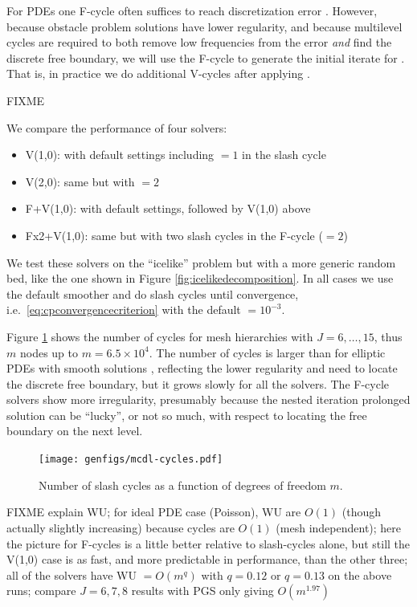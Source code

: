 \documentclass[letterpaper,final,12pt,reqno]{amsart}
\theoremstyle{claim}
\numberwithin{equation}{section}
\numberwithin{figure}{section}
\numberwithin{table}{section}
\numberwithin{theorem}{section}
\begin{document}
For PDEs one F-cycle often suffices to reach discretization error \cite{Trottenbergetal2001}.  However, because obstacle problem solutions have lower regularity, and because multilevel cycles are required to both remove low frequencies from the error \emph{and} find the discrete free boundary, we will use the F-cycle to generate the initial iterate for .  That is, in practice we do additional V-cycles after applying .

FIXME

We compare the performance of four solvers:
\begin{itemize}
\item \textsf{V(1,0)}:  with default settings including $=1$ in the slash cycle
\item \textsf{V(2,0)}: same but with $=2$
\item \textsf{F+V(1,0)}:  with default settings, followed by \textsf{V(1,0)} above
\item \textsf{Fx2+V(1,0)}: same but with two slash cycles in the F-cycle ($=2$)
\end{itemize}
We test these solvers on the ``icelike'' problem but with a more generic random bed, like the one shown in Figure \ref{fig:icelikedecomposition}.  In all cases we use the default  smoother and do slash cycles until convergence, i.e.~\eqref{eq:cpconvergencecriterion} with the default  $=10^{-3}$.

Figure \ref{fig:mcdl-cycles} shows the number of cycles for mesh hierarchies with $J=6,\dots,15$, thus $m$ nodes up to $m=6.5 \times 10^4$.  The number of cycles is larger than for elliptic PDEs with smooth solutions \cite{Trottenbergetal2001}, reflecting the lower regularity and need to locate the discrete free boundary, but it grows slowly for all the solvers.  The F-cycle solvers show more irregularity, presumably because the nested iteration prolonged solution can be ``lucky'', or not so much, with respect to locating the free boundary on the next level.

\begin{figure}
\texttt{[image: genfigs/mcdl-cycles.pdf]}
\caption{Number of slash cycles as a function of degrees of freedom $m$.}
\label{fig:mcdl-cycles}
\end{figure}

FIXME explain WU; for ideal PDE case (Poisson), WU are $O(1)$ (though actually slightly increasing) because cycles are $O(1)$ (mesh independent); here the picture for F-cycles is a little better relative to slash-cycles alone, but still the \textsf{V(1,0)} case is as fast, and more predictable in performance, than the other three; all of the solvers have WU $=O(m^q)$ with $q=0.12$ or $q=0.13$ on the above runs; compare $J=6,7,8$ results with PGS only giving $O(m^{1.97})$
\end{document}
